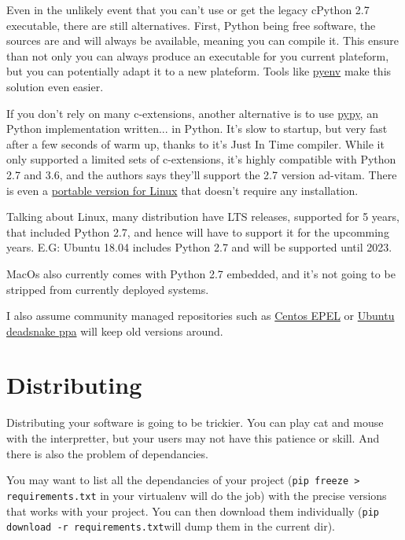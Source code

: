 Even in the unlikely event that you can't use or get the legacy cPython 2.7 executable, there are still alternatives. First, Python being free software, the sources are and will always be available, meaning you can compile it. This ensure than not only you can always produce an executable for you current plateform, but you can potentially adapt it to a new plateform. Tools like \href{https://github.com/pyenv/pyenv}{pyenv} make this solution even easier.

If you don't rely on many c-extensions, another alternative is to use \href{https://pypy.org}{pypy}, an Python implementation written... in Python. It's slow to startup, but very fast after a few seconds of warm up, thanks to it's Just In Time compiler. While it only supported a limited sets of c-extensions, it's highly compatible with Python 2.7 and 3.6, and the authors says they'll support the 2.7 version ad-vitam. There is even a \href{https://github.com/squeaky-pl/portable-pypy}{portable version for Linux} that doesn't require any installation.

Talking about Linux, many distribution have LTS releases, supported for 5 years, that included Python 2.7, and hence will have to support it for the upcomming years. E.G: Ubuntu 18.04 includes Python 2.7 and will be supported until 2023.

MacOs also currently comes with Python 2.7 embedded, and it's not going to be stripped from currently deployed systems.

I also assume community managed repositories such as \href{https://www.linuxtricks.fr/wiki/centos-rhel-ajouter-des-depots-supplementaires}{Centos EPEL} or \href{https://launchpad.net/~deadsnakes/+archive/ubuntu/ppa}{Ubuntu deadsnake ppa} will keep old versions around.

\section{Distributing}

Distributing your software is going to be trickier. You can play cat and mouse with the interpretter, but your users may not have this patience or skill. And there is also the problem of dependancies.

You may want to list all the dependancies of your project (\lstinline{pip freeze > requirements.txt} in your virtualenv will do the job) with the precise versions that works with your project. You can then download them individually (\lstinline{pip download -r requirements.txt}will dump them in the current dir).

